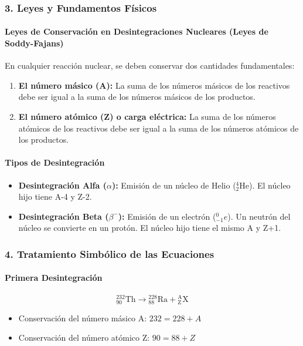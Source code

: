 \subsubsection*{3. Leyes y Fundamentos Físicos}
\paragraph*{Leyes de Conservación en Desintegraciones Nucleares (Leyes de Soddy-Fajans)}
En cualquier reacción nuclear, se deben conservar dos cantidades fundamentales:
\begin{enumerate}
    \item \textbf{El número másico (A):} La suma de los números másicos de los reactivos debe ser igual a la suma de los números másicos de los productos.
    \item \textbf{El número atómico (Z) o carga eléctrica:} La suma de los números atómicos de los reactivos debe ser igual a la suma de los números atómicos de los productos.
\end{enumerate}
\paragraph*{Tipos de Desintegración}
\begin{itemize}
    \item \textbf{Desintegración Alfa ($\alpha$):} Emisión de un núcleo de Helio ($_{2}^{4}\text{He}$). El núcleo hijo tiene A-4 y Z-2.
    \item \textbf{Desintegración Beta ($\beta^-$):} Emisión de un electrón ($_{-1}^{0}e$). Un neutrón del núcleo se convierte en un protón. El núcleo hijo tiene el mismo A y Z+1.
\end{itemize}

\subsubsection*{4. Tratamiento Simbólico de las Ecuaciones}
\paragraph*{Primera Desintegración}
$$ {}_{90}^{232}\text{Th} \rightarrow {}_{88}^{228}\text{Ra} + {}_{\text{Z}}^{\text{A}}\text{X} $$
\begin{itemize}
    \item Conservación del número másico A: $232 = 228 + A$
    \item Conservación del número atómico Z: $90 = 88 + Z$
\end{itemize}
